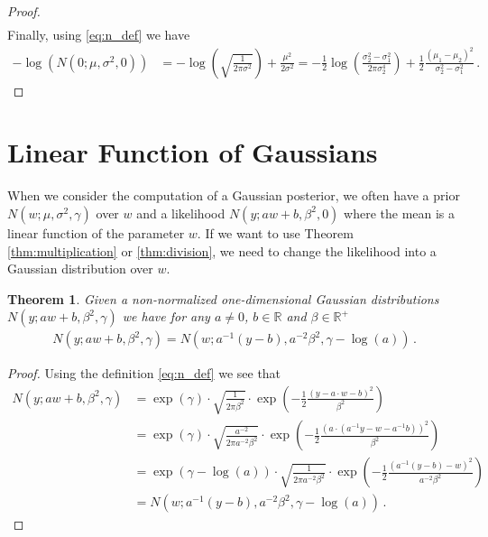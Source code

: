 \documentclass[a4paper]{article}
\newtheorem{thm}{Theorem}
\begin{document}
\begin{proof}
\begin{align*}
    \end{align*}
    Finally, using \eqref{eq:n_def} we have
    \begin{align*}
        -\log\left(N\left(0;\mu,\sigma^2,0\right)\right) & = -\log\left(\sqrt{\frac{1}{2\pi \sigma^2}}\right) + \frac{\mu^2}{2\sigma^2} = -\frac{1}{2}\log\left(\frac{\sigma_2^2 - \sigma_1^2}{2\pi \sigma_2^4}\right) + \frac{1}{2}\frac{\left(\mu_1-\mu_2\right)^2}{\sigma_2^2-\sigma_1^2} \,.
    \end{align*}
\end{proof}

\section*{Linear Function of Gaussians}
When we consider the computation of a Gaussian posterior, we often have a prior $N\left(w;\mu,\sigma^2,\gamma\right)$ over $w$ and a likelihood $N\left(y;aw + b,\beta^2,0\right)$ where the mean is a linear function of the parameter $w$. If we want to use Theorem \ref{thm:multiplication} or \ref{thm:division}, we need to change the likelihood into a Gaussian distribution over $w$.
\begin{thm} \label{thm:linear}
    Given a non-normalized one-dimensional Gaussian distributions $N(y;aw + b,\beta^2,\gamma)$ we have for any $a \not= 0$, $b \in \mathbb{R}$ and $\beta \in \mathbb{R}^+$
    \begin{align}
        N\left(y;aw + b, \beta^2,\gamma\right) = N\left(w;a^{-1}(y - b), a^{-2}\beta^2,\gamma - \log(a)\right) \,.
    \end{align}
\end{thm}

\begin{proof}
    Using the definition \eqref{eq:n_def} we see that
    \begin{align*}
        N\left(y;aw + b, \beta^2,\gamma\right) & =
        \exp(\gamma)\cdot \sqrt{\frac{1}{2\pi \beta^2}} \cdot \exp\left(-\frac{1}{2}\frac{\left(y - a\cdot w - b\right)^2}{\beta^2}\right)                                                                               \\
                                               & = \exp(\gamma)\cdot \sqrt{\frac{a^{-2}}{2\pi a^{-2}\beta^2}} \cdot \exp\left(-\frac{1}{2}\frac{\left(a\cdot\left(a^{-1}y - w - a^{-1}b\right)\right)^2}{\beta^2}\right) \\
                                               & = \exp(\gamma-\log(a))\cdot \sqrt{\frac{1}{2\pi a^{-2}\beta^2}} \cdot \exp\left(-\frac{1}{2}\frac{\left(a^{-1}\left(y - b\right) - w\right)^2}{a^{-2}\beta^2}\right)    \\
                                               & = N\left(w;a^{-1}(y - b), a^{-2}\beta^2,\gamma - \log(a)\right) \,.
    \end{align*}
\end{proof}
\end{document}
